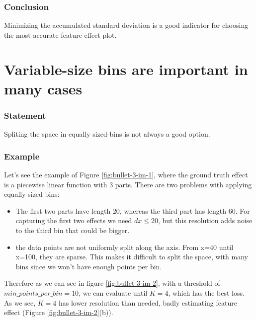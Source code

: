 \documentclass{article}
\begin{document}
\subsubsection*{Conclusion}

Minimizing the accumulated standard deviation is a good indicator for
choosing the most accurate feature effect plot.

\section{Variable-size bins are important in many cases}

\subsubsection*{Statement}

Spliting the space in equally sized-bins is not always a good option.

\subsubsection*{Example}

Let's see the example of Figure \ref{fig:bullet-3-im-1}, where the
ground truth effect is a piecewise linear function with 3 parts. There
are two problems with applying equally-sized bins:

\begin{itemize}
\item The first two parts have length 20, whereas the third part has
  length 60. For capturing the first two effects we need
  \(dx \leq 20\), but this resolution adds noise to the third bin that
  could be bigger.
\item the data points are not uniformly split along the axis. From
  x=40 until x=100, they are sparse. This makes it difficult to split
  the space, with many bins since we won't have enough points per bin.
\end{itemize}

Therefore as we can see in figure \ref{fig:bullet-3-im-2}, with a
threshold of \(min\_points\_per\_bin = 10\), we can evaluate until
\(K=4\), which has the best loss. As we see, \(K=4\) has lower
resolution than needed, badly estimating feature effect (Figure
\ref{fig:bullet-3-im-2}(b)).
\end{document}
